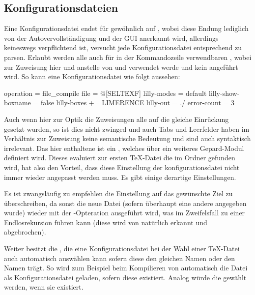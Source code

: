 \subsection{Konfigurationsdateien}
Eine Konfigurationsdatei endet für gewöhnlich auf , wobei diese Endung lediglich von der Autovervollständigung und der GUI anerkannt wird, allerdings keineswegs verpflichtend ist, \Jake versucht jede Konfigurationsdatei entsprechend zu parsen. Erlaubt werden alle auch für \Jake in der Kommandozeile verwendbaren , wobei zur Zuweisung hier \T{=} und \T{+=} anstelle von \T{:} und \T{+:} verwendet werde und kein \say{\T{-}} angeführt wird. So kann eine Konfigurationsdatei wie folgt aussehen:
\begin{gepard}
operation           = file_compile
file                = @[SELTEXF]
lilly-modes         = default
lilly-show-boxname  = false
lilly-boxes        += LIMERENCE
lilly-out           = ./
error-count         = 3
\end{gepard}
Auch wenn hier zur Optik die Zuweisungen alle auf die gleiche Einrückung gesetzt wurden, so ist dies nicht zwinged und auch Tabs und Leerfelder haben im Verhältnis zur Zuweisung keine semantische Bedeutung und sind auch syntaktisch irrelevant. Das hier enthaltene  ist ein , welches über ein weiteres Gepard-Modul definiert wird. Dieses evaluiert zur ersten TeX-Datei die im Ordner gefunden wird, hat also den Vorteil, dass diese Einstellung der konfigurationsdatei nicht immer wieder angepasst werden muss. Es gibt einige derartige Einstellungen.
\begin{bemerkung}
    Es ist zwangsläufig zu empfehlen die Einstellung  auf das gewünschte Ziel zu überschreiben, da sonst die neue Datei (sofern überhaupt eine andere angegeben wurde) wieder mit der -Opteration ausgeführt wird, was im Zweifelsfall zu einer Endlosrekursion führen kann (diese wird von \Jake natürlich erkannt und abgebrochen).
\end{bemerkung}
Weiter besitzt \Jake die  , die eine Konfigurationsdatei bei der Wahl einer TeX-Datei auch automatisch auswählen kann sofern diese den gleichen Namen oder den Namen  trägt. So wird zum Beispiel beim Kompilieren von  automatisch die Datei  als Konfigurationsdatei geladen, sofern diese existiert. Analog würde die  gewählt werden, wenn sie existiert.
